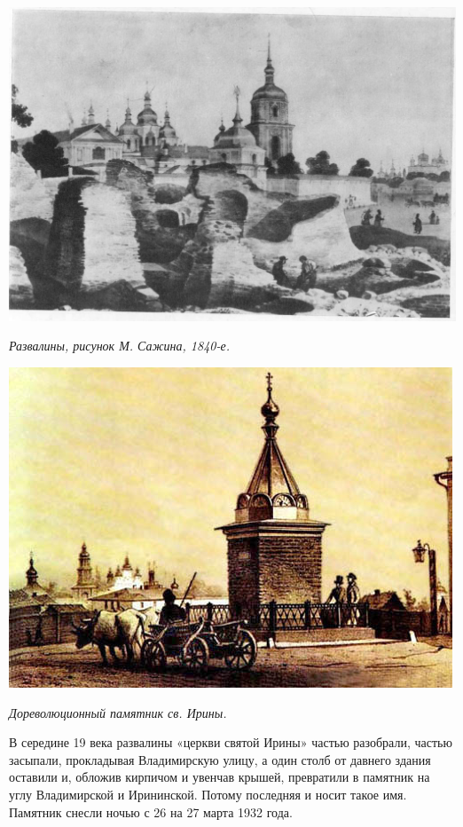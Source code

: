 \newpage
\vspace*{\fill}
\begin{center}
\includegraphics[width=\linewidth]{chast-volga/dir/irinsaj.jpg}

\textit{Развалины, рисунок М. Сажина, 1840-е.}
\end{center}


\begin{center}
\includegraphics[width=\linewidth]{chast-volga/dir/irininsky_pamyatnik.jpg}

\textit{Дореволюционный памятник св. Ирины.}
\end{center}
\vspace*{\fill}
\newpage

В середине 19 века развалины «церкви святой Ирины» частью разобрали, частью засыпали, прокладывая Владимирскую улицу, а один столб от давнего здания оставили и, обложив кирпичом и увенчав крышей, превратили в памятник на углу Владимирской и Ирининской. Потому последняя и носит такое имя. Памятник снесли ночью с 26 на 27 марта 1932 года.


